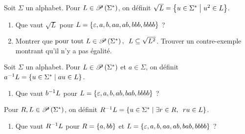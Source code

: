 \begin{exo}
Soit \(\Sigma\) un alphabet. Pour \(L\in\mathscr{P}\left(\Sigma^{*}\right)\), on définit \(\sqrt{L}=\left\lbrace u\in\Sigma^{*}\;\middle|\; u^2\in L\right\rbrace\).

\begin{enumerate}
    \item Que vaut \(\sqrt{L}\) pour \(L=\left\lbrace\varepsilon,a,b,aa,ab,bbb,bbbb\right\rbrace\) ? \\
    \item Montrer que \(\quantifs{\tpt L\in\P{\Sigma\etoile}}L\subset\sqrt{L^2}\). Trouver un contre-exemple montrant qu'il n'y a pas égalité.
\end{enumerate}
\end{exo}

\begin{exo}
Soit \(\Sigma\) un alphabet. Pour \(L\in\mathscr{P}\left(\Sigma^{*}\right)\) et \(a\in\Sigma\), on définit \(a^{-1} L=\left\lbrace u\in\Sigma^{*}\;\middle|\; au\in L\right\rbrace\).

\begin{enumerate}[series=ex1.10]
    \item Que vaut \(b^{-1} L\) pour \(L=\left\lbrace\varepsilon,a,b,ab,bab,bbbb\right\rbrace\) ?
\end{enumerate}

Pour \(R,L\in\mathscr{P}\left(\Sigma^{*}\right)\), on définit \(R\inv L=\accol{u\in\Sigma\etoile\tq\quantifs{\exists r\in R}ru\in L}\).

\begin{enumerate}[resume=ex1.10]
    \item Que vaut \(R^{-1} L\) pour \(R=\left\lbrace a,bb\right\rbrace\) et \(L=\left\lbrace\varepsilon,a,b,aa,ab,bab,bbbb\right\rbrace\) ?
\end{enumerate}
\end{exo}
